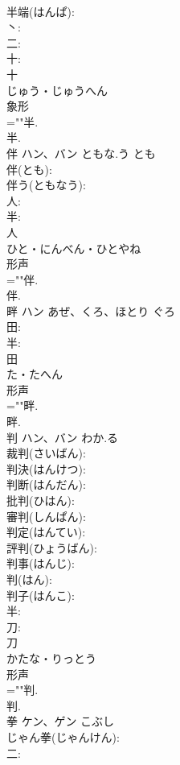 \documentclass[8pt]{extreport}
\begin{document}
\begin{CJK}{UTF8}{min}
\\	半端(はんぱ): 
\\	丶: 
\\	二: 
\\	十: 
\\	十	
\\	じゅう・じゅうへん	
\\	象形 
\\	=""半.
\\	半.
\\	伴	ハン、バン	ともな.う	とも	
\\	伴(とも): 
\\	伴う(ともなう): 
\\	人: 
\\	半: 
\\	人	
\\	ひと・にんべん・ひとやね	
\\	形声 
\\	=""伴.
\\	伴.
\\	畔	ハン	あぜ、くろ、ほとり	ぐろ	
\\	田: 
\\	半: 
\\	田	
\\	た・たへん	
\\	形声 
\\	=""畔.
\\	畔.
\\	判	ハン、バン	わか.る		
\\	裁判(さいばん): 
\\	判決(はんけつ): 
\\	判断(はんだん): 
\\	批判(ひはん): 
\\	審判(しんぱん): 
\\	判定(はんてい): 
\\	評判(ひょうばん): 
\\	判事(はんじ): 
\\	判(はん): 
\\	判子(はんこ): 
\\	半: 
\\	刀: 
\\	刀	
\\	かたな・りっとう	
\\	形声 
\\	=""判.
\\	判.
\\	拳	ケン、ゲン	こぶし		
\\	じゃん拳(じゃんけん): 
\\	二: 

\end{CJK}
\end{document}
